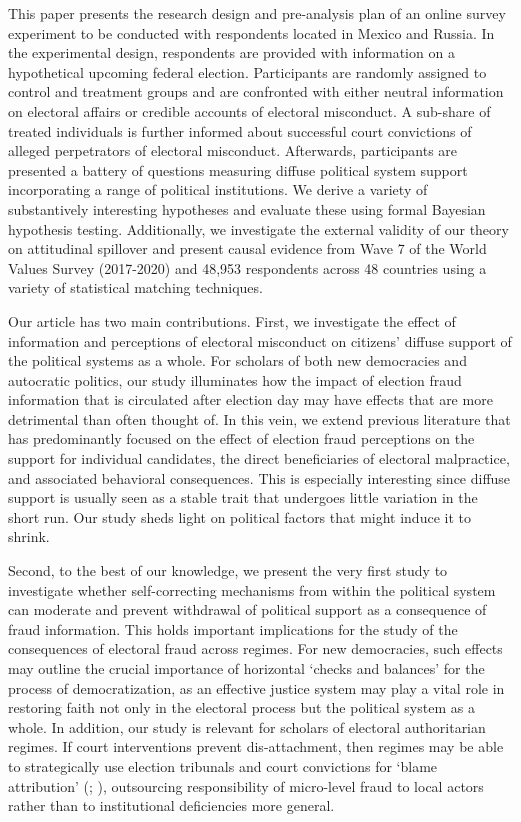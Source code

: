 \documentclass[11pt, ngerman,english,a4]{article}
\begin{document}
This paper presents the research design and pre-analysis plan of an online survey experiment to be conducted with respondents located in Mexico and Russia. In the experimental design, respondents are provided with information on a hypothetical upcoming federal election. Participants are randomly assigned to control and treatment groups and are confronted with either neutral information on electoral affairs or credible accounts of electoral misconduct. A sub-share of treated individuals is further informed about successful court convictions of alleged perpetrators of electoral misconduct. Afterwards, participants are presented a battery of questions measuring diffuse political system support incorporating a range of political institutions. We derive a variety of substantively interesting hypotheses and evaluate these using formal Bayesian hypothesis testing. Additionally, we investigate the external validity of our theory on attitudinal spillover and present causal evidence from Wave 7 of the World Values Survey (2017-2020) and 48,953 respondents across 48 countries using a variety of statistical matching techniques.  

Our article has two main contributions. First, we investigate the effect of information and perceptions of electoral misconduct on citizens’ diffuse support of the political systems as a whole. For scholars of both new democracies and autocratic politics, our study illuminates how the impact of election fraud information that is circulated after election day may have effects that are more detrimental than often thought of. In this vein, we extend previous literature that has predominantly focused on the effect of election fraud perceptions on the support for individual candidates, the direct beneficiaries of electoral malpractice, and associated behavioral consequences. This is especially interesting since diffuse support is usually seen as a stable trait that undergoes little variation in the short run. Our study sheds light on political factors that might induce it to shrink. 

Second, to the best of our knowledge, we present the very first study to investigate whether self-correcting mechanisms from within the political system can moderate and prevent withdrawal of political support as a consequence of fraud information. This holds important implications for the study of the consequences of electoral fraud across regimes. For new democracies, such effects may outline the crucial importance of horizontal `checks and balances’ for the process of democratization, as an effective justice system may play a vital role in restoring faith not only in the electoral process but the political system as a whole. In addition, our study is relevant for  scholars of electoral authoritarian regimes. If court interventions prevent dis-attachment, then regimes may be able to strategically use election tribunals and court convictions for ‘blame attribution’ (\citealt{Beazer2019}; \citealt{Rozenas2019b}), outsourcing responsibility of micro-level fraud to local actors rather than to institutional deficiencies more general.
\end{document}
